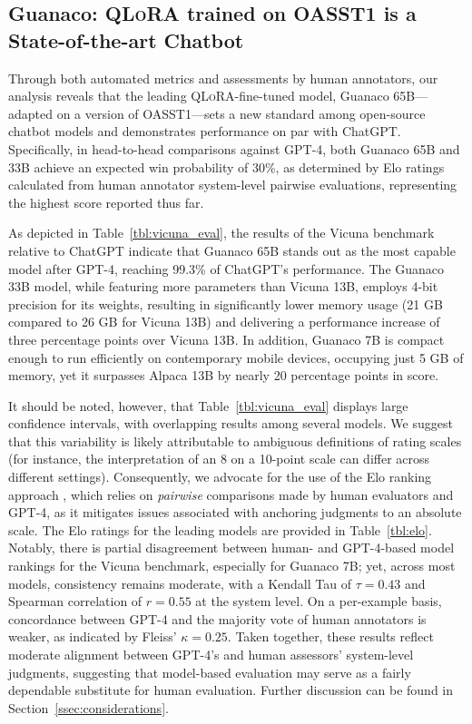 \subsection{\textbf{Guanaco}: \textsc{QLoRA} trained on OASST1 is a State-of-the-art Chatbot} 

Through both automated metrics and assessments by human annotators, our analysis reveals that the leading \textsc{QLoRA}-fine-tuned model, {Guanaco} 65B—adapted on a version of OASST1—sets a new standard among open-source chatbot models and demonstrates performance on par with ChatGPT. Specifically, in head-to-head comparisons against GPT-4, both {Guanaco} 65B and 33B achieve an expected win probability of 30\%, as determined by Elo ratings calculated from human annotator system-level pairwise evaluations, representing the highest score reported thus far.

As depicted in Table~\ref{tbl:vicuna_eval}, the results of the Vicuna benchmark \cite{vicuna2023} relative to ChatGPT indicate that {Guanaco} 65B stands out as the most capable model after GPT-4, reaching 99.3\% of ChatGPT’s performance. The {Guanaco} 33B model, while featuring more parameters than Vicuna 13B, employs 4-bit precision for its weights, resulting in significantly lower memory usage (21 GB compared to 26 GB for Vicuna 13B) and delivering a performance increase of three percentage points over Vicuna 13B. In addition, {Guanaco} 7B is compact enough to run efficiently on contemporary mobile devices, occupying just 5 GB of memory, yet it surpasses Alpaca 13B by nearly 20 percentage points in score.

It should be noted, however, that Table~\ref{tbl:vicuna_eval} displays large confidence intervals, with overlapping results among several models. We suggest that this variability is likely attributable to ambiguous definitions of rating scales (for instance, the interpretation of an 8 on a 10-point scale can differ across different settings). Consequently, we advocate for the use of the Elo ranking approach \citep{elo1967proposed}, which relies on \textit{pairwise} comparisons made by human evaluators and GPT-4, as it mitigates issues associated with anchoring judgments to an absolute scale. The Elo ratings for the leading models are provided in Table~\ref{tbl:elo}. Notably, there is partial disagreement between human- and GPT-4-based model rankings for the Vicuna benchmark, especially for Guanaco 7B; yet, across most models, consistency remains moderate, with a Kendall Tau of $\tau=0.43$ and Spearman correlation of $r=0.55$ at the system level. On a per-example basis, concordance between GPT-4 and the majority vote of human annotators is weaker, as indicated by Fleiss’ $\kappa=0.25$. Taken together, these results reflect moderate alignment between GPT-4’s and human assessors’ system-level judgments, suggesting that model-based evaluation may serve as a fairly dependable substitute for human evaluation. Further discussion can be found in Section~\ref{ssec:considerations}.

